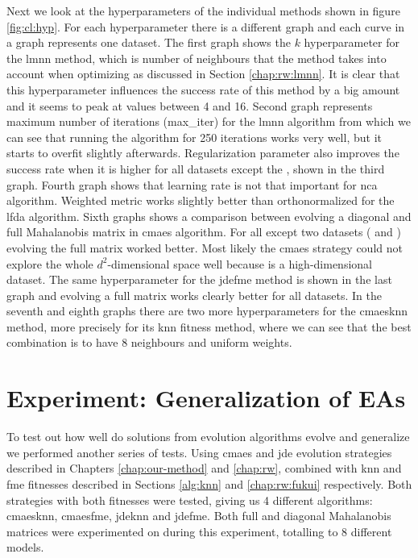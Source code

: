 \documentclass[12pt,a4paper]{report}
\begin{document}
Next we look at the hyperparameters of the individual methods shown in figure \ref{fig:cl:hyp}. For each hyperparameter there is a different graph and each curve in a graph represents one dataset. The first graph shows the $k$ hyperparameter for the \ac{lmnn} method, which is number of neighbours that the method takes into account when optimizing as discussed in Section \ref{chap:rw:lmnn}. It is clear that this hyperparameter influences the success rate of this method by a big amount and it seems to peak at values between 4 and 16. Second graph represents maximum number of iterations (max\_iter) for the \ac{lmnn} algorithm from which we can see that running the algorithm for 250 iterations works very well, but it starts to overfit slightly afterwards. Regularization parameter also improves the success rate when it is higher for all datasets except the , shown in the third graph. Fourth graph shows that learning rate is not that important for \ac{nca} algorithm. Weighted metric works slightly better than orthonormalized for the \ac{lfda} algorithm. Sixth graphs shows a comparison between evolving a diagonal and full Mahalanobis matrix in \ac{cmaes} algorithm. For all except two datasets ( and ) evolving the full matrix worked better. Most likely the \ac{cmaes} strategy could not explore the whole $d^2$-dimensional space well because  is a high-dimensional dataset. The same hyperparameter for the \ac{jdefme} method is shown in the last graph and evolving a full matrix works clearly better for all datasets. In the seventh and eighth graphs there are two more hyperparameters for the \ac{cmaesknn} method, more precisely for its \ac{knn} fitness method, where we can see that the best combination is to have 8 neighbours and uniform weights.


\section{Experiment: Generalization of EAs} \label{chap:exp:fitness}

To test out how well do solutions from evolution algorithms evolve and generalize we performed another series of tests. Using \ac{cmaes} and \ac{jde} evolution strategies described in Chapters \ref{chap:our-method} and \ref{chap:rw}, combined with \ac{knn} and \ac{fme} fitnesses described in Sections \ref{alg:knn} and \ref{chap:rw:fukui} respectively. Both strategies with both fitnesses were tested, giving us 4 different algorithms: \ac{cmaesknn}, \ac{cmaesfme}, \ac{jdeknn} and \ac{jdefme}. Both full and diagonal Mahalanobis matrices were experimented on during this experiment, totalling to 8 different models.
\end{document}

